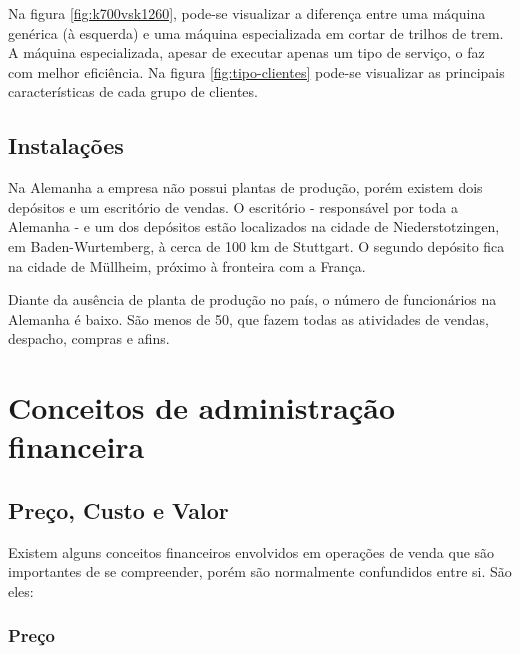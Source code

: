 \documentclass[12pt]{article}
\begin{document}
	Na figura \ref{fig:k700vsk1260}, pode-se visualizar a diferença entre uma máquina genérica (à esquerda) e uma máquina especializada em cortar de trilhos de trem. A máquina especializada, apesar de executar apenas um tipo de serviço, o faz com melhor eficiência. Na figura \ref{fig:tipo-clientes} pode-se visualizar as principais características de cada grupo de clientes.
	




\subsection{Instalações}
	
	Na Alemanha a empresa não possui plantas de produção, porém existem dois depósitos e um escritório de vendas. O escritório - responsável por toda a Alemanha - e um dos depósitos estão localizados na cidade de Niederstotzingen, em Baden-Wurtemberg, à cerca de 100 km de Stuttgart. O segundo depósito fica na cidade de Müllheim, próximo à fronteira com a França.

	Diante da ausência de planta de produção no país, o número de funcionários na Alemanha é baixo. São menos de 50, que fazem todas as atividades de vendas, despacho, compras e afins.

\section{Conceitos de administração financeira}

\subsection{Preço, Custo e Valor}
	
	Existem alguns conceitos financeiros envolvidos em operações de venda que são importantes de se compreender, porém são normalmente confundidos entre si. São eles:

\subsubsection{Preço}
\end{document}
